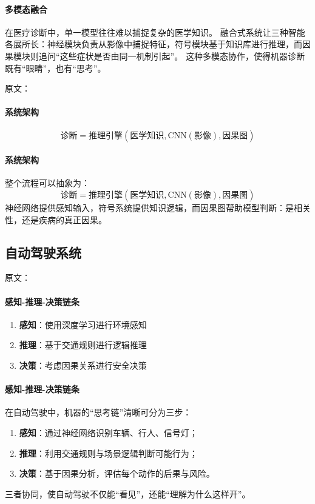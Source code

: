 \paragraph{多模态融合}
在医疗诊断中，单一模型往往难以捕捉复杂的医学知识。  
融合式系统让三种智能各展所长：神经模块负责从影像中捕捉特征，符号模块基于知识库进行推理，而因果模块则追问“这些症状是否由同一机制引起”。  
这种多模态协作，使得机器诊断既有“眼睛”，也有“思考”。

原文：
\paragraph{系统架构}
$$\text{诊断} = \text{推理引擎}(\text{医学知识}, \text{CNN}(\text{影像}), \text{因果图})$$
\paragraph{系统架构}
整个流程可以抽象为：  
$$\text{诊断} = \text{推理引擎}(\text{医学知识}, \text{CNN}(\text{影像}), \text{因果图})$$
神经网络提供感知输入，符号系统提供知识逻辑，而因果图帮助模型判断：是相关性，还是疾病的真正因果。



\subsection{自动驾驶系统}

原文：
\paragraph{感知-推理-决策链条}
\begin{enumerate}
\item \textbf{感知}：使用深度学习进行环境感知
\item \textbf{推理}：基于交通规则进行逻辑推理
\item \textbf{决策}：考虑因果关系进行安全决策
\end{enumerate}
\paragraph{感知-推理-决策链条}
在自动驾驶中，机器的“思考链”清晰可分为三步：  
\begin{enumerate}
\item \textbf{感知}：通过神经网络识别车辆、行人、信号灯；  
\item \textbf{推理}：利用交通规则与场景逻辑判断可能行为；  
\item \textbf{决策}：基于因果分析，评估每个动作的后果与风险。  
\end{enumerate}
三者协同，使自动驾驶不仅能“看见”，还能“理解为什么这样开”。

